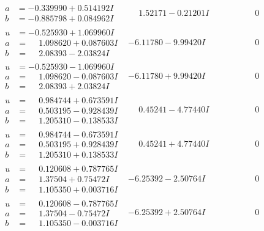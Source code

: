 \documentclass[1p]{elsarticle_modified}
\theoremstyle{definition}
\begin{document}
$$\begin{array}{c|c|c}
\begin{aligned}
a &= -0.339990 + 0.514192 I \\
b &= -0.885798 + 0.084962 I\end{aligned}
 & \phantom{-}1.52171 - 0.21201 I & \phantom{-0.000000 } 0 \\ \hline\begin{aligned}
u &= -0.525930 + 1.069960 I \\
a &= \phantom{-}1.098620 + 0.087603 I \\
b &= \phantom{-}2.08393 - 2.03824 I\end{aligned}
 & -6.11780 - 9.99420 I & \phantom{-0.000000 } 0 \\ \hline\begin{aligned}
u &= -0.525930 - 1.069960 I \\
a &= \phantom{-}1.098620 - 0.087603 I \\
b &= \phantom{-}2.08393 + 2.03824 I\end{aligned}
 & -6.11780 + 9.99420 I & \phantom{-0.000000 } 0 \\ \hline\begin{aligned}
u &= \phantom{-}0.984744 + 0.673591 I \\
a &= \phantom{-}0.503195 - 0.928439 I \\
b &= \phantom{-}1.205310 - 0.138533 I\end{aligned}
 & \phantom{-}0.45241 - 4.77440 I & \phantom{-0.000000 } 0 \\ \hline\begin{aligned}
u &= \phantom{-}0.984744 - 0.673591 I \\
a &= \phantom{-}0.503195 + 0.928439 I \\
b &= \phantom{-}1.205310 + 0.138533 I\end{aligned}
 & \phantom{-}0.45241 + 4.77440 I & \phantom{-0.000000 } 0 \\ \hline\begin{aligned}
u &= \phantom{-}0.120608 + 0.787765 I \\
a &= \phantom{-}1.37504 + 0.75472 I \\
b &= \phantom{-}1.105350 + 0.003716 I\end{aligned}
 & -6.25392 - 2.50764 I & \phantom{-0.000000 } 0 \\ \hline\begin{aligned}
u &= \phantom{-}0.120608 - 0.787765 I \\
a &= \phantom{-}1.37504 - 0.75472 I \\
b &= \phantom{-}1.105350 - 0.003716 I\end{aligned}
 & -6.25392 + 2.50764 I & \phantom{-0.000000 } 0 \\ \hline\begin{aligned}

\end{aligned}
\end{array}$$
\end{document}
